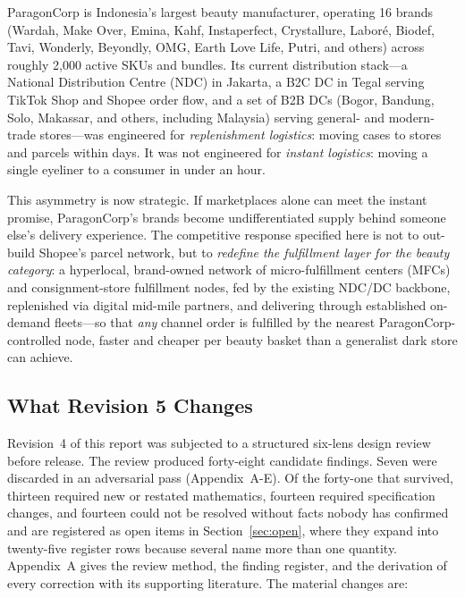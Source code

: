 \documentclass[10pt,twocolumn,letterpaper]{article}
\theoremstyle{definition}
\begin{document}
ParagonCorp is Indonesia's largest beauty manufacturer, operating 16 brands (Wardah, Make Over, Emina, Kahf, Instaperfect, Crystallure, Labor\'e, Biodef, Tavi, Wonderly, Beyondly, OMG, Earth Love Life, Putri, and others) across roughly 2,000 active SKUs and bundles. Its current distribution stack---a National Distribution Centre (NDC) in Jakarta, a B2C DC in Tegal serving TikTok Shop and Shopee order flow, and a set of B2B DCs (Bogor, Bandung, Solo, Makassar, and others, including Malaysia) serving general- and modern-trade stores---was engineered for \emph{replenishment logistics}: moving cases to stores and parcels within days. It was not engineered for \emph{instant logistics}: moving a single eyeliner to a consumer in under an hour.

This asymmetry is now strategic. If marketplaces alone can meet the instant promise, ParagonCorp's brands become undifferentiated supply behind someone else's delivery experience. The competitive response specified here is not to out-build Shopee's parcel network, but to \emph{redefine the fulfillment layer for the beauty category}: a hyperlocal, brand-owned network of micro-fulfillment centers (MFCs) and consignment-store fulfillment nodes, fed by the existing NDC/DC backbone, replenished via digital mid-mile partners, and delivering through established on-demand fleets---so that \emph{any} channel order is fulfilled by the nearest ParagonCorp-controlled node, faster and cheaper per beauty basket than a generalist dark store can achieve.

\subsection{What Revision 5 Changes}

Revision~4 of this report was subjected to a structured six-lens design review before release. The review produced forty-eight candidate findings. Seven were discarded in an adversarial pass (Appendix~A-E). Of the forty-one that survived, thirteen required new or restated mathematics, fourteen required specification changes, and fourteen could not be resolved without facts nobody has confirmed and are registered as open items in Section~\ref{sec:open}, where they expand into twenty-five register rows because several name more than one quantity. Appendix~A gives the review method, the finding register, and the derivation of every correction with its supporting literature. The material changes are:
\end{document}
